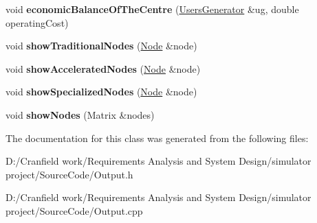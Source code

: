 \begin{DoxyCompactItemize}
\item 
\mbox{\label{class_output_a3adb2cfe1229a1267fe8160ab70c562e}} 
void {\bfseries economic\+Balance\+Of\+The\+Centre} (\mbox{\hyperlink{class_users_generator}{Users\+Generator}} \&ug, double operating\+Cost)
\item 
\mbox{\label{class_output_a536b72eb2ce4b4bc2b15b315e823be92}} 
void {\bfseries show\+Traditional\+Nodes} (\mbox{\hyperlink{class_node}{Node}} \&node)
\item 
\mbox{\label{class_output_a10c9b770f51f6809f8d1da04fa88aa2e}} 
void {\bfseries show\+Accelerated\+Nodes} (\mbox{\hyperlink{class_node}{Node}} \&node)
\item 
\mbox{\label{class_output_a2e26fc88b8088a4cae12b7e6854992a6}} 
void {\bfseries show\+Specialized\+Nodes} (\mbox{\hyperlink{class_node}{Node}} \&node)
\item 
\mbox{\label{class_output_a063064bb29bc5b4de55705960785feff}} 
void {\bfseries show\+Nodes} (Matrix \&nodes)
\end{DoxyCompactItemize}


The documentation for this class was generated from the following files\+:\begin{DoxyCompactItemize}
\item 
D\+:/\+Cranfield work/\+Requirements Analysis and System Design/simulator project/\+Source\+Code/Output.\+h\item 
D\+:/\+Cranfield work/\+Requirements Analysis and System Design/simulator project/\+Source\+Code/Output.\+cpp\end{DoxyCompactItemize}
